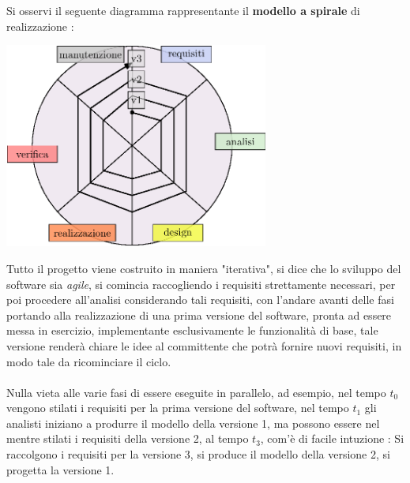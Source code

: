 \documentclass[12pt, letterpaper]{article}
\newcommand{\acc}{\\\hphantom{}\\}
\begin{document}
Si osservi il seguente diagramma rappresentante il \textbf{modello a spirale} di realizzazione : \begin{center}
    \includegraphics[width=0.65\textwidth ]{images/cicloDiVita.eps}
\end{center}
Tutto il progetto viene costruito in maniera "iterativa", si dice che lo sviluppo del software sia
\textit{agile}, si comincia raccogliendo i requisiti strettamente necessari, per poi procedere all'analisi
considerando tali requisiti, con l'andare avanti delle fasi portando alla realizzazione di una prima versione
del software, pronta ad essere messa in esercizio, implementante esclusivamente le funzionalità di base, tale
versione renderà chiare le idee al committente che potrà fornire nuovi requisiti, in modo tale da ricominciare il ciclo.\acc
Nulla vieta alle varie fasi di essere eseguite in parallelo, ad esempio, nel tempo \(t_0\) vengono stilati
i requisiti per la prima versione del software, nel tempo \(t_1\) gli analisti iniziano a produrre il modello della versione 1, ma
possono essere nel mentre stilati i requisiti della versione 2, al tempo \(t_3\), com'è di facile intuzione :
Si raccolgono i requisiti per la versione 3, si produce il modello della versione 2, si progetta la versione 1.
\end{document}
